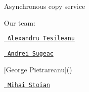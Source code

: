 Asynchronous copy service

Our team\+:
\begin{DoxyItemize}
\item \href{https://github.com/TesileanuAlexandru}{\texttt{ Alexandru Tesileanu}}
\item \href{https://github.com/AndreiSugeac}{\texttt{ Andrei Sugeac}}
\item \mbox{[}George Pietrareanu\mbox{]}()
\item \href{https://github.com/mihainsto}{\texttt{ Mihai Stoian}} 
\end{DoxyItemize}